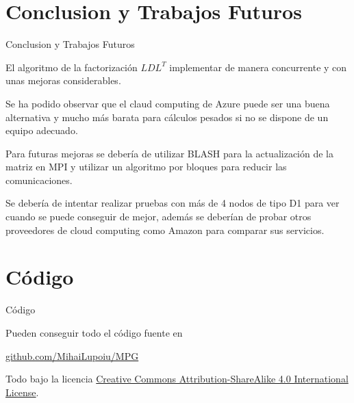 \documentclass[10pt]{beamer}
\begin{document}
\section{Conclusion y Trabajos Futuros}
\begin{frame}{Conclusion y Trabajos Futuros}

  El algoritmo de la factorización $LDL^T$ implementar de manera concurrente y con unas mejoras considerables.\linebreak[2]

  Se ha podido observar que el claud computing de Azure puede ser una buena alternativa y mucho más barata para cálculos pesados si no se dispone de un equipo adecuado.\linebreak[2]


  Para futuras mejoras se debería de utilizar BLASH para la actualización de la matriz en MPI y utilizar un algoritmo por bloques para reducir las comunicaciones.
  
  Se debería de intentar realizar pruebas con más de 4 nodos de tipo D1 para ver cuando se puede conseguir de mejor, además se deberían de probar otros proveedores de cloud computing como Amazon para comparar sus servicios.
    
\end{frame}
\section{Código}
\begin{frame}{Código}

  Pueden conseguir todo el código fuente en
  \begin{center}\url{github.com/MihaiLupoiu/MPG}\end{center}

  Todo bajo la licencia
  \href{http://creativecommons.org/licenses/by-sa/4.0/}{Creative Commons
  Attribution-ShareAlike 4.0 International License}.

  \begin{center}\ccbysa\end{center}

\end{frame}
\end{document}
